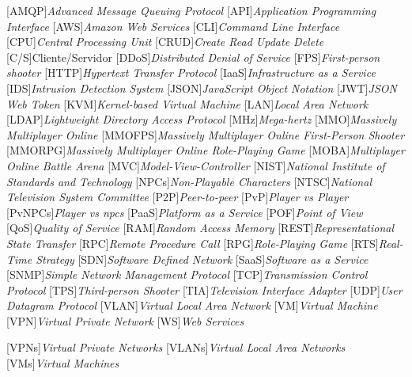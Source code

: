 \begin{acronym}[]
	[AMQP]{{\it Advanced Message Queuing Protocol}}
	[API]{{\it Application Programming Interface}}
  [AWS]{{\it Amazon Web Services}}
	[CLI]{{\it Command Line Interface}}
	[CPU]{{\it Central Processing Unit}}
	[CRUD]{{\it Create Read Update Delete}}
	[C/S]{{Cliente/Servidor}}
	[DDoS]{{\it Distributed Denial of Service}}
	[FPS]{{\it First-person shooter}}
	[HTTP]{{\it Hypertext Transfer Protocol}}
	[IaaS]{{\it Infrastructure as a Service}}
  [IDS]{{\it Intrusion Detection System}}
	[JSON]{{\it JavaScript Object Notation}}
	[JWT]{{\it JSON Web Token}}
	[KVM]{{\it Kernel-based Virtual Machine}}
	[LAN]{{\it Local Area Network}}
  [LDAP]{{\it Lightweight Directory Access Protocol}}
	[MHz]{{\it Mega-hertz}}
	[MMO]{{\it Massively Multiplayer Online}}
	[MMOFPS]{{\it Massively Multiplayer Online First-Person Shooter}}
	[MMORPG]{{\it Massively Multiplayer Online Role-Playing Game}}
	[MOBA]{{\it Multiplayer Online Battle Arena}}
	[MVC]{{\it Model-View-Controller}}
	[NIST]{{\it National Institute of Standards and Technology}}
	[NPCs]{{\it Non-Playable Characters}}
	[NTSC]{{\it National Television System Committee}}
	[P2P]{{\it Peer-to-peer}}
	[PvP]{{\it Player vs Player}}
	[PvNPCs]{{\it Player vs \ac{npcs}}}
	[PaaS]{{\it Platform as a Service}}
	[POF]{{\it Point of View}}
	[QoS]{{\it Quality of Service}}
	[RAM]{{\it Random Access Memory}}
	[REST]{{\it Representational State Transfer}}
	[RPC]{{\it Remote Procedure Call}}
	[RPG]{{\it Role-Playing Game}}
	[RTS]{{\it Real-Time Strategy}}
	[SDN]{{\it Software Defined Network}}
	[SaaS]{{\it Software as a Service}}
	[SNMP]{{\it Simple Network Management Protocol}}
	[TCP]{{\it Transmission Control Protocol}}
	[TPS]{{\it Third-person Shooter}}
	[TIA]{{\it Television Interface Adapter}}
	[UDP]{{\it User Datagram Protocol}}
	[VLAN]{{\it Virtual Local Area Network}}
	[VM]{{\it Virtual Machine}}
	[VPN]{{\it Virtual Private Network}}
	[WS]{{\it Web Services}}



	[VPNs]{{\it Virtual Private Networks}}
	[VLANs]{{\it Virtual Local Area Networks}}
	[VMs]{{\it Virtual Machines}}
\end{acronym}


